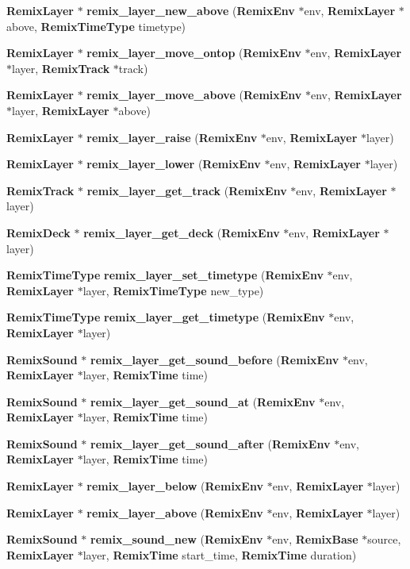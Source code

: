 \begin{DoxyCompactItemize}
\item 
{\bf RemixLayer} $\ast$ {\bf remix\_\-layer\_\-new\_\-above} ({\bf RemixEnv} $\ast$env, {\bf RemixLayer} $\ast$above, {\bf RemixTimeType} timetype)
\item 
{\bf RemixLayer} $\ast$ {\bf remix\_\-layer\_\-move\_\-ontop} ({\bf RemixEnv} $\ast$env, {\bf RemixLayer} $\ast$layer, {\bf RemixTrack} $\ast$track)
\item 
{\bf RemixLayer} $\ast$ {\bf remix\_\-layer\_\-move\_\-above} ({\bf RemixEnv} $\ast$env, {\bf RemixLayer} $\ast$layer, {\bf RemixLayer} $\ast$above)
\item 
{\bf RemixLayer} $\ast$ {\bf remix\_\-layer\_\-raise} ({\bf RemixEnv} $\ast$env, {\bf RemixLayer} $\ast$layer)
\item 
{\bf RemixLayer} $\ast$ {\bf remix\_\-layer\_\-lower} ({\bf RemixEnv} $\ast$env, {\bf RemixLayer} $\ast$layer)
\item 
{\bf RemixTrack} $\ast$ {\bf remix\_\-layer\_\-get\_\-track} ({\bf RemixEnv} $\ast$env, {\bf RemixLayer} $\ast$layer)
\item 
{\bf RemixDeck} $\ast$ {\bf remix\_\-layer\_\-get\_\-deck} ({\bf RemixEnv} $\ast$env, {\bf RemixLayer} $\ast$layer)
\item 
{\bf RemixTimeType} {\bf remix\_\-layer\_\-set\_\-timetype} ({\bf RemixEnv} $\ast$env, {\bf RemixLayer} $\ast$layer, {\bf RemixTimeType} new\_\-type)
\item 
{\bf RemixTimeType} {\bf remix\_\-layer\_\-get\_\-timetype} ({\bf RemixEnv} $\ast$env, {\bf RemixLayer} $\ast$layer)
\item 
{\bf RemixSound} $\ast$ {\bf remix\_\-layer\_\-get\_\-sound\_\-before} ({\bf RemixEnv} $\ast$env, {\bf RemixLayer} $\ast$layer, {\bf RemixTime} time)
\item 
{\bf RemixSound} $\ast$ {\bf remix\_\-layer\_\-get\_\-sound\_\-at} ({\bf RemixEnv} $\ast$env, {\bf RemixLayer} $\ast$layer, {\bf RemixTime} time)
\item 
{\bf RemixSound} $\ast$ {\bf remix\_\-layer\_\-get\_\-sound\_\-after} ({\bf RemixEnv} $\ast$env, {\bf RemixLayer} $\ast$layer, {\bf RemixTime} time)
\item 
{\bf RemixLayer} $\ast$ {\bf remix\_\-layer\_\-below} ({\bf RemixEnv} $\ast$env, {\bf RemixLayer} $\ast$layer)
\item 
{\bf RemixLayer} $\ast$ {\bf remix\_\-layer\_\-above} ({\bf RemixEnv} $\ast$env, {\bf RemixLayer} $\ast$layer)
\item 
{\bf RemixSound} $\ast$ {\bf remix\_\-sound\_\-new} ({\bf RemixEnv} $\ast$env, {\bf RemixBase} $\ast$source, {\bf RemixLayer} $\ast$layer, {\bf RemixTime} start\_\-time, {\bf RemixTime} duration)

\end{DoxyCompactItemize}
